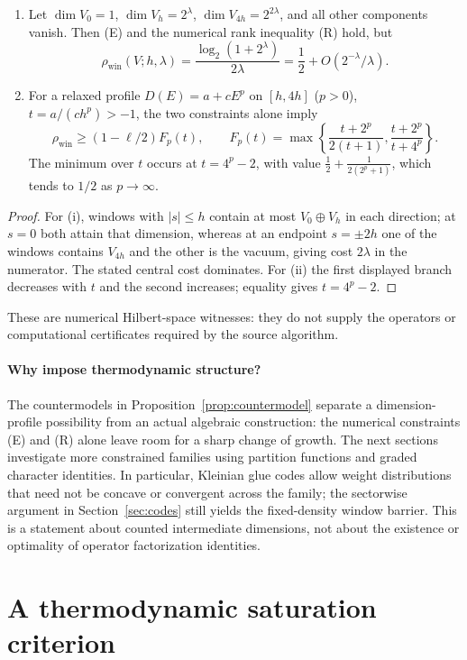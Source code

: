 \documentclass[10pt,a4paper]{article}
\numberwithin{equation}{section}
\theoremstyle{remark}\newtheorem{remark}[theorem]{Remark}\newtheorem{question}[theorem]{Question}
\newcommand{\rhow}{\rho_{\mathrm{win}}}\newcommand{\F}{\mathbb F}\newcommand{\K}{\mathbb K}\newcommand{\Z}{\mathbb Z}\newcommand{\R}{\mathbb R}\newcommand{\cB}{\mathcal L}\newcommand{\wt}{\mathrm{wt}}\newcommand{\dimn}{\operatorname{dim}}\newcommand{\supp}{\operatorname{supp}}
\begin{document}
\begin{proposition}\label{prop:countermodel}
\begin{enumerate}
\item Let $\dimn V_0=1$, $\dimn V_h=2^\lambda$, $\dimn V_{4h}=2^{2\lambda}$, and all other components vanish. Then (E) and the numerical rank inequality (R) hold, but
\[\rhow(V;h,\lambda)=\frac{\log_2(1+2^\lambda)}{2\lambda}=\frac12+O(2^{-\lambda}/\lambda).\]
\item For a relaxed profile $D(E)=a+cE^p$ on $[h,4h]$ ($p>0$), $t=a/(ch^p)>-1$, the two constraints alone imply
\[
\rhow\ge(1-\ell/2)F_p(t),\qquad
F_p(t)=\max\left\{\frac{t+2^p}{2(t+1)},\frac{t+2^p}{t+4^p}\right\}.
\]
The minimum over $t$ occurs at $t=4^p-2$, with value $\frac12+\frac{1}{2(2^p+1)}$, which tends to $1/2$ as $p\to\infty$.
\end{enumerate}
\end{proposition}
\begin{proof}For (i), windows with $|s|\le h$ contain at most $V_0\oplus V_h$ in each direction; at $s=0$ both attain that dimension, whereas at an endpoint $s=\pm2h$ one of the windows contains $V_{4h}$ and the other is the vacuum, giving cost $2\lambda$ in the numerator. The stated central cost dominates. For (ii) the first displayed branch decreases with $t$ and the second increases; equality gives $t=4^p-2$.\end{proof}
These are numerical Hilbert-space witnesses: they do not supply the operators or computational certificates required by the source algorithm.

\paragraph{Why impose thermodynamic structure?}
The countermodels in Proposition~\ref{prop:countermodel} separate a dimension-profile possibility from an actual algebraic construction: the numerical constraints (E) and (R) alone leave room for a sharp change of growth. The next sections investigate more constrained families using partition functions and graded character identities. In particular, Kleinian glue codes allow weight distributions that need not be concave or convergent across the family; the sectorwise argument in Section~\ref{sec:codes} still yields the fixed-density window barrier. This is a statement about counted intermediate dimensions, not about the existence or optimality of operator factorization identities.

\section{A thermodynamic saturation criterion}\label{sec:thermal}
\end{document}
